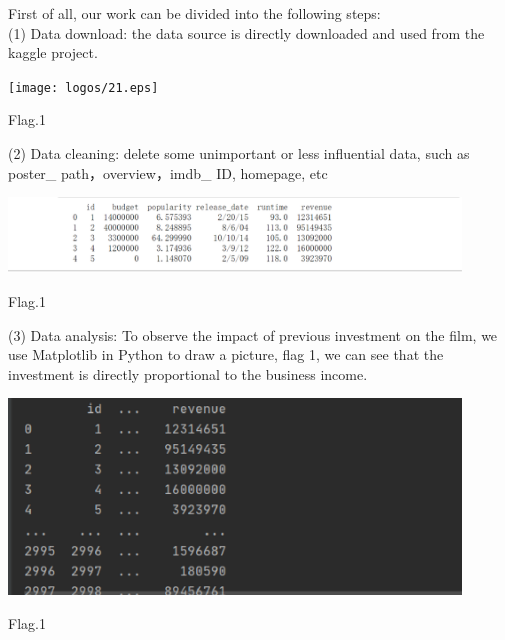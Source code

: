 First of all, our work can be divided into the following steps:   \\
(1) Data download: the data source is directly downloaded and used from the kaggle project.\\
\begin{center}
  \begin{minipage}{0.3\linewidth}
  \centering

  \texttt{[image: logos/21.eps]}
 
  {\small{Flag.1}}

  \end{minipage}
  \hfill
\end{center}
(2) Data cleaning: delete some unimportant or less influential data, such as poster_ path，overview，imdb_ ID, homepage, etc \\
\begin{center}
  \begin{minipage}{0.3\linewidth}
  \centering

  \includegraphics[width=0.9\textwidth]{logos/24.eps}
 
  {\small{Flag.1}}

  \end{minipage}
  \hfill
\end{center}
(3) Data analysis: To observe the impact of previous investment on the film, we use Matplotlib in Python to draw a picture, flag 1, we can see that the investment is directly proportional to the business income.

\begin{center}
  \begin{minipage}{0.3\linewidth}
  \centering

  \includegraphics[width=0.9\textwidth]{logos/4.eps}
 
  {\small{Flag.1}}

  \end{minipage}
  \hfill
\end{center}

